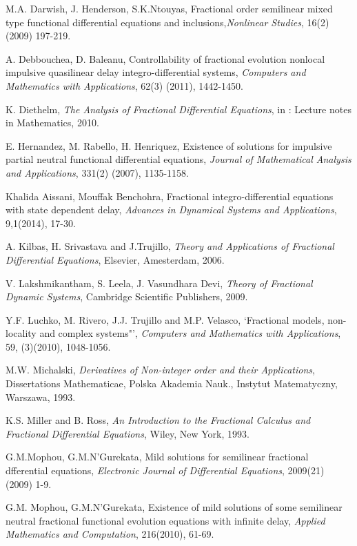 \documentclass[11pt]{article}
\begin{document}
\begin{thebibliography}{USA00}
M.A. Darwish, J. Henderson, S.K.Ntouyas, Fractional order semilinear mixed type functional differential equations and inclusions,{\it Nonlinear Studies}, 16(2)(2009) 197-219.


 A. Debbouchea, D. Baleanu, Controllability of fractional evolution nonlocal impulsive quasilinear delay integro-differential systems, {\it Computers and Mathematics with Applications}, 62(3) (2011), 1442-1450.

 K. Diethelm, {\it The Analysis of Fractional Differential Equations}, in : Lecture notes in Mathematics, 2010.


 E. Hernandez, M. Rabello, H. Henriquez, Existence of solutions for impulsive partial neutral functional differential equations, {\it Journal of Mathematical Analysis and Applications}, 331(2) (2007), 1135-1158.

 Khalida Aissani, Mouffak Benchohra, Fractional integro-differential equations with state dependent delay, {\it Advances in Dynamical Systems and Applications}, 9,1(2014), 17-30.

 A. Kilbas, H. Srivastava and J.Trujillo, {\it Theory and Applications of Fractional Differential Equations}, Elsevier, Amesterdam, 2006.

 V. Lakshmikantham, S. Leela, J. Vasundhara Devi, {\it Theory of Fractional Dynamic Systems}, Cambridge Scientific Publishers, 2009.

 Y.F. Luchko, M. Rivero, J.J. Trujillo and M.P. Velasco, `Fractional models, non-locality and complex systems"', {\it Computers and Mathematics with Applications}, 59, (3)(2010), 1048-1056.



M.W. Michalski, {\it Derivatives of Non-integer order and their Applications}, Dissertations Mathematicae, Polska Akademia Nauk., Instytut Matematyczny, Warszawa, 1993.

 K.S. Miller and B. Ross, {\it An Introduction to the Fractional Calculus and Fractional Differential Equations}, Wiley, New York, 1993.

 G.M.Mophou, G.M.N'Gurekata, Mild solutions for semilinear fractional dfferential equations, {\it Electronic Journal of Differential Equations}, 2009(21) (2009) 1-9.

G.M. Mophou, G.M.N'Gurekata, Existence of mild solutions of some semilinear neutral fractional functional evolution equations with infinite delay, {\it Applied Mathematics and Computation}, 216(2010), 61-69.





\end{thebibliography}
\end{document}
